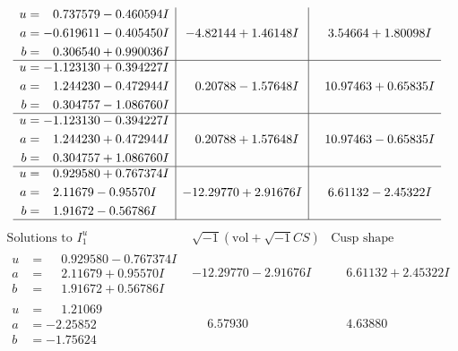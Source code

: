 \documentclass[1p]{elsarticle_modified}
\theoremstyle{definition}
\newcommand{\I}{\sqrt{-1}}
\begin{document}
$$\begin{array}{c|c|c}
\begin{aligned}
u &= \phantom{-}0.737579 - 0.460594 I \\
a &= -0.619611 - 0.405450 I \\
b &= \phantom{-}0.306540 + 0.990036 I\end{aligned}
 & -4.82144 + 1.46148 I & \phantom{-}3.54664 + 1.80098 I \\ \hline\begin{aligned}
u &= -1.123130 + 0.394227 I \\
a &= \phantom{-}1.244230 - 0.472944 I \\
b &= \phantom{-}0.304757 - 1.086760 I\end{aligned}
 & \phantom{-}0.20788 - 1.57648 I & \phantom{-}10.97463 + 0.65835 I \\ \hline\begin{aligned}
u &= -1.123130 - 0.394227 I \\
a &= \phantom{-}1.244230 + 0.472944 I \\
b &= \phantom{-}0.304757 + 1.086760 I\end{aligned}
 & \phantom{-}0.20788 + 1.57648 I & \phantom{-}10.97463 - 0.65835 I \\ \hline\begin{aligned}
u &= \phantom{-}0.929580 + 0.767374 I \\
a &= \phantom{-}2.11679 - 0.95570 I \\
b &= \phantom{-}1.91672 - 0.56786 I\end{aligned}
 & -12.29770 + 2.91676 I & \phantom{-}6.61132 - 2.45322 I\\
 \hline 
 \end{array}$$\newpage$$\begin{array}{c|c|c}  
\text{Solutions to }I^u_{1}& \I (\text{vol} + \sqrt{-1}CS) & \text{Cusp shape}\\
 \hline 
\begin{aligned}
u &= \phantom{-}0.929580 - 0.767374 I \\
a &= \phantom{-}2.11679 + 0.95570 I \\
b &= \phantom{-}1.91672 + 0.56786 I\end{aligned}
 & -12.29770 - 2.91676 I & \phantom{-}6.61132 + 2.45322 I \\ \hline\begin{aligned}
u &= \phantom{-}1.21069\phantom{ +0.000000I} \\
a &= -2.25852\phantom{ +0.000000I} \\
b &= -1.75624\phantom{ +0.000000I}\end{aligned}
 & \phantom{-}6.57930\phantom{ +0.000000I} & \phantom{-}4.63880\phantom{ +0.000000I} \\ \hline\begin{aligned}

\end{aligned}
\end{array}$$
\end{document}
